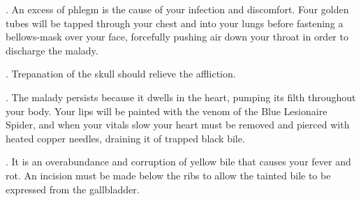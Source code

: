 {{

\hrulefill



  \item {}. An excess of phlegm is the cause of your infection and discomfort. Four golden tubes will be tapped through your chest and into your lungs before fastening a bellows-mask over your face, forcefully pushing air down your throat in order to discharge the malady. 


\hrulefill



  \item {}. Trepanation of the skull should relieve the affliction. 


\hrulefill



  \item {}. The malady persists because it dwells in the heart, pumping its filth throughout your body. Your lips will be painted with the venom of the Blue Lesionaire Spider, and when your vitals slow your heart must be removed and pierced with heated copper needles, draining it of trapped black bile.  


\hrulefill



  \item {}. It is an overabundance and corruption of yellow bile that causes your fever and rot. An incision must be made below the ribs to allow the tainted bile to be expressed from the gallbladder. 


\hrulefill



}}
